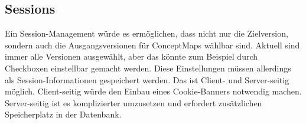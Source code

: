 \subsection{Sessions}

Ein Session-Management würde es ermöglichen, dass nicht nur die Zielversion, sondern auch die Ausgangsversionen für ConceptMaps wählbar sind. Aktuell sind immer alle Versionen ausgewählt, aber das könnte zum Beispiel durch Checkboxen einstellbar gemacht werden. Diese Einstellungen müssen allerdings als Session-Informationen gespeichert werden. Das ist Client- und Server-seitig möglich. Client-seitig würde den Einbau eines Cookie-Banners notwendig machen. Server-seitig ist es komplizierter umzusetzen und erfordert zusätzlichen Speicherplatz in der Datenbank. 

